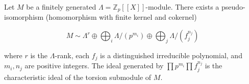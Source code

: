 Let $M$ be a finitely generated $\Lambda = \mathbb{Z}_p[[X]]$-module. There exists a pseudo-isomorphism (homomorphism with finite kernel and cokernel)

$$M \sim \Lambda^r \oplus \bigoplus_i \Lambda/(p^{m_i}) \oplus \bigoplus_j \Lambda/(f_j^{n_j})$$

where $r$ is the $\Lambda$-rank, each $f_j$ is a distinguished irreducible polynomial, and $m_i, n_j$ are positive integers. The ideal generated by $\prod p^{m_i} \prod f_j^{n_j}$ is the characteristic ideal of the torsion submodule of $M$.
